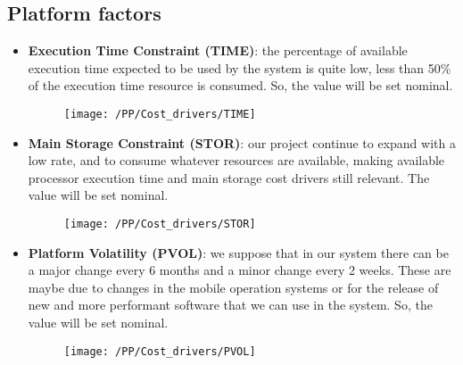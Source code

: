 \subsection{Platform factors}
\begin{itemize}
    \item \textbf{Execution Time Constraint (TIME)}: the percentage of available execution time expected to be used by the system is quite low, less than 50\% of the execution time resource is consumed. So, the value will be set nominal.
    \begin{figure}[!ht]
      \centering
      \vspace{0.2cm}
      \texttt{[image: /PP/Cost\_drivers/TIME]}\\
      \vspace{0.2cm}
      \label{fig:TIME} 
    \end{figure}
    \item \textbf{Main Storage Constraint (STOR)}: our project continue to expand with a low rate, and to consume whatever resources are available, making available processor execution time and main storage cost drivers still relevant. The value will be set nominal.
    \begin{figure}[!ht]
      \centering
      \vspace{0.2cm}
      \texttt{[image: /PP/Cost\_drivers/STOR]}\\
      \vspace{0.2cm}
      \label{fig:STOR} 
    \end{figure}
    \item \textbf{Platform Volatility (PVOL)}: we suppose that in our system there can be a major change every 6 months and a minor change every 2 weeks. These are maybe due to changes in the mobile operation systems or for the release of new and more performant software that we can use in the system. So, the value will be set nominal. 
    \begin{figure}[!ht]
      \centering
      \vspace{0.2cm}
      \texttt{[image: /PP/Cost\_drivers/PVOL]}\\
      \vspace{0.2cm}
      \label{fig:PVOL} 
    \end{figure}
\end{itemize}

